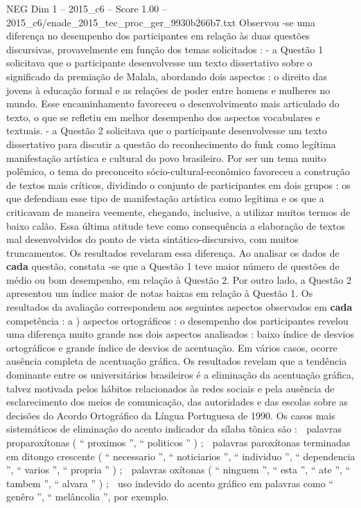 \begin{textsample}{NEG Dim 1 – 2015\_c6 – Score 1.00 – 2015\_c6/enade\_2015\_tec\_proc\_ger\_9930b266b7.txt}
Observou -se uma diferença no desempenho dos participantes em relação às duas questões discursivas, provavelmente em função dos temas solicitados : - a Questão 1 solicitava que o participante desenvolvesse um texto dissertativo sobre o significado da premiação de Malala, abordando dois aspectos : o direito das jovens à educação formal e as relações de poder entre homens e mulheres no mundo.
Esse encaminhamento favoreceu o desenvolvimento mais articulado do texto, o que se refletiu em melhor desempenho dos aspectos vocabulares e textuais. - a Questão 2 solicitava que o participante desenvolvesse um texto dissertativo para discutir a questão do reconhecimento do funk como legítima manifestação artística e cultural do povo brasileiro.
Por ser um tema muito polêmico, o tema do preconceito sócio-cultural-econômico favoreceu a construção de textos mais críticos, dividindo o conjunto de participantes em dois grupos : os que defendiam esse tipo de manifestação artística como legítima e os que a criticavam de maneira veemente, chegando, inclusive, a utilizar muitos termos de baixo calão.
Essa última atitude teve como consequência a elaboração de textos mal desenvolvidos do ponto de vista sintático-discursivo, com muitos truncamentos.
Os resultados revelaram essa diferença.
Ao analisar os dados de \textbf{cada} questão, constata -se que a Questão 1 teve maior número de questões de médio ou bom desempenho, em relação à Questão 2.
Por outro lado, a Questão 2 apresentou um índice maior de notas baixas em relação à Questão 1.
Os resultados da avaliação correspondem aos seguintes aspectos observados em \textbf{cada} competência : a ) aspectos ortográficos : o desempenho dos participantes revelou uma diferença muito grande nos dois aspectos analisados : baixo índice de desvios ortográficos e grande índice de desvios de acentuação.
Em vários casos, ocorre ausência completa de acentuação gráfica.
Os resultados revelam que a tendência dominante entre os universitários brasileiros é a eliminação da acentuação gráfica, talvez motivada pelos hábitos relacionados às redes sociais e pela ausência de esclarecimento dos meios de comunicação, das autoridades e das escolas sobre as decisões do Acordo Ortográfico da Língua Portuguesa de 1990.
Os casos mais sistemáticos de eliminação do acento indicador da sílaba tônica são :  palavras proparoxítonas ( “ proximos ”, “ politicos ” ) ;  palavras paroxítonas terminadas em ditongo crescente ( “ necessario ”, “ noticiarios ”, “ individuo ”, “ dependencia ”, “ varios ”, “ propria ” ) ;  palavras oxítonas ( “ ninguem ”, “ esta ”, “ ate ”, “ tambem ”, “ alvara ” ) ;  uso indevido do acento gráfico em palavras como “ genêro ”, “ melâncolia ”, por exemplo.

\end{textsample}
